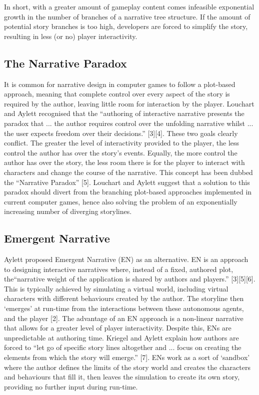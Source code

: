 \documentclass{sig-alternate-05-2015}
\begin{document}
In short, with a greater amount of gameplay content comes infeasible exponential growth in the number of branches of a narrative tree structure. If the amount of potential story branches is too high, developers are forced to simplify the story, resulting in less (or no) player interactivity.

\subsection{The Narrative Paradox}

It is common for narrative design in computer games to follow a plot-based approach, meaning that complete control over every aspect of the story is required by the author, leaving little room for interaction by the player. Louchart and Aylett recognised that the ``authoring of interactive narrative presents the paradox that ... the author requires control over the unfolding narrative whilst ... the user expects freedom over their decisions.'' [3][4]. These two goals clearly conflict. The greater the level of interactivity provided to the player, the less control the author has over the story's events. Equally, the more control the author has over the story, the less room there is for the player to interact with characters and change the course of the narrative. This concept has been dubbed the ``Narrative Paradox'' [5]. Louchart and Aylett suggest that a solution to this paradox should divert from the branching plot-based approaches implemented in current computer games, hence also solving the problem of an exponentially increasing number of diverging storylines.

\subsection{Emergent Narrative}

Aylett proposed Emergent Narrative (EN) as an alternative. EN is an approach to designing interactive narratives where, instead of a fixed, authored plot, the``narrative weight of the application is shared by authors and players.'' [3][5][6]. This is typically achieved by simulating a virtual world, including virtual characters with different behaviours created by the author. The storyline then `emerges' at run-time from the interactions between these autonomous agents, and the player [2]. The advantage of an EN approach is a non-linear narrative that allows for a greater level of player interactivity. Despite this, ENs are unpredictable at authoring time. Kriegel and Aylett explain how authors are forced to ``let go of specific story lines altogether and ... focus on creating the elements from which the story will emerge.'' [7]. ENs work as a sort of `sandbox' where the author defines the limits of the story world and creates the characters and behaviours that fill it, then leaves the simulation to create its own story, providing no further input during run-time.\\
\end{document}
